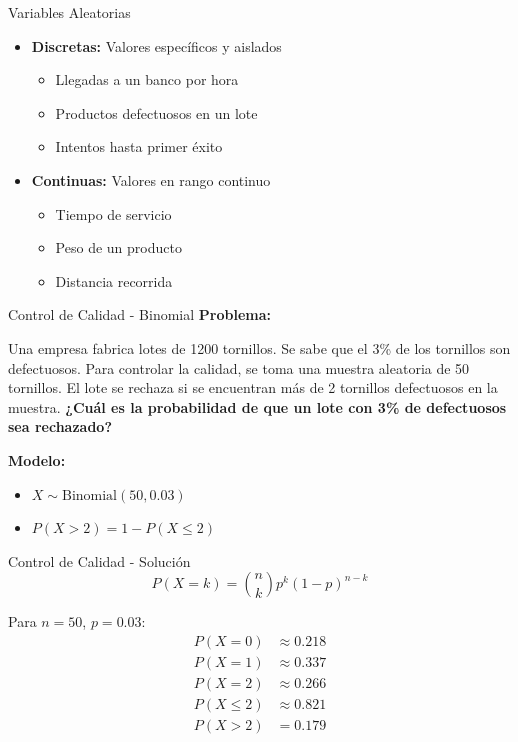 \documentclass{beamer}
\begin{document}
\begin{frame}{Variables Aleatorias}
    \begin{itemize}
        \item \textbf{Discretas:} Valores específicos y aislados
        \begin{itemize}
            \item Llegadas a un banco por hora
            \item Productos defectuosos en un lote
            \item Intentos hasta primer éxito
        \end{itemize}
        \item \textbf{Continuas:} Valores en rango continuo
        \begin{itemize}
            \item Tiempo de servicio
            \item Peso de un producto
            \item Distancia recorrida
        \end{itemize}
    \end{itemize}
\end{frame}

\begin{frame}{Control de Calidad - Binomial}
    \textbf{Problema:}
    
    Una empresa fabrica lotes de 1200 tornillos. Se sabe que el 3\% de los tornillos son defectuosos. Para controlar la calidad, se toma una muestra aleatoria de 50 tornillos. El lote se rechaza si se encuentran más de 2 tornillos defectuosos en la muestra. \textbf{¿Cuál es la probabilidad de que un lote con 3\% de defectuosos sea rechazado?}
    
    \textbf{Modelo:}
    \begin{itemize}
        \item $X \sim \text{Binomial}(50, 0.03)$
        \item $P(X > 2) = 1 - P(X \leq 2)$
    \end{itemize}
\end{frame}

\begin{frame}{Control de Calidad - Solución}
    \[P(X = k) = \binom{n}{k} p^k (1-p)^{n-k}\]
    
    Para $n = 50$, $p = 0.03$:
    \begin{align*}
        P(X=0) &\approx 0.218 \\
        P(X=1) &\approx 0.337 \\
        P(X=2) &\approx 0.266 \\
        P(X \leq 2) &\approx 0.821 \\
        P(X > 2) &= 0.179
    \end{align*}
\end{frame}
\end{document}
